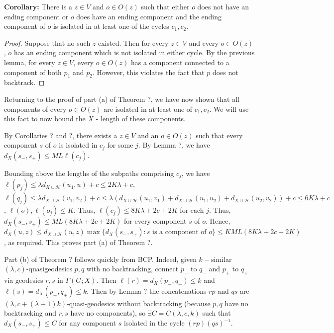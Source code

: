 \documentclass[12pt]{article}
\newcommand{\vs}{\vskip10pt}
\begin{document}
	\vs 
	
	\textbf{Corollary: } There is a $z \in V$ and $o \in O(z)$ such that either $o$ does not have an ending component or $o$ does have an ending component and the ending component of $o$ is isolated in at least one of the cycles $c_1,c_2$.
	
	\begin{proof}
		
		Suppose that no such $z$ existed. Then for every $z \in V$ and every $o \in O(z)$, $o$ has an ending component which is not isolated in either cycle. By the previous lemma, for every $z \in V$, every $o \in O(z)$ has a component connected to a component of both $p_1$ and $p_2$. However, this violates the fact that $p$ does not backtrack. 
		
	\end{proof}

	Returning to the proof of part (a) of Theorem ?, we have now shown that all components of every $o \in O(z)$ are isolated in at least one of $c_1, c_2$. We will use this fact to now bound the $X$ - length of these components. 
	
	\vs 
	
	By Corollaries ? and ?, there exists a $z \in V$ and an $o \in O(z)$ such that every component $s$ of $o$ is isolated in $c_j$ for some $j$. By Lemma ?, we have $d_X(s_-, s_+) \leq ML \ell(c_j)$. 
	
	\vs 
	
	Bounding above the lengths of the subpaths comprising $c_j$, we have $\ell(p_j) \leq \lambda d_{X \cup \mathcal{H}}(u_1, u) + c \leq 2K\lambda + c$, $\ell(q_j) \leq \lambda d_{X \cup \mathcal{H}}(v_1, v_2) + c \leq \lambda (d_{X \cup \mathcal{H}}(u_1, v_1) + d_{X \cup \mathcal{H}}(u_1, u_2) + d_{X \cup \mathcal{H}}(u_2, v_2)) + c \leq 6 K \lambda + c$, $\ell(o), \ell(o_j) \leq K$. Thus, $\ell(c_j) \leq 8K \lambda + 2c + 2K$ for each $j$.  Thus, $d_X(s_-, s_+) \leq ML(8K \lambda + 2c + 2K)$ for every component $s$ of $o$. Hence, $d_X(u,z) \leq d_{X \cup \mathcal{H}}(u,z) \max \{d_X(s_-, s_+): s \text{ is a component of } o\}\leq K ML(8K \lambda + 2c + 2K)$, as required. This proves part (a) of Theorem ?. 
	
	\vs
	
	Part (b) of Theorem ? follows quickly from BCP. Indeed, given $k-$similar $(\lambda, c)$-quasigeodesics $p,q$ with no backtracking, connect $p_-$ to $q_-$ and $p_+$ to $q_+$ via geodesics $r,s$ in $\Gamma(G;X)$. Then $\ell(r) = d_X(p_-, q_-) \leq k$ and $\ell(s) = d_X(p_+, q_+) \leq k$. Then by Lemma ? the concatenations $rp$ and $qs$ are $(\lambda, c + (\lambda + 1)k)$-quasi-geodesics without backtracking (because $p,q$ have no backtracking and $r,s$ have no components), so $\exists C = C(\lambda, c, k)$ such that $d_X(s_-, s_+) \leq C$ for any component $s$ isolated in the cycle $(rp)(qs)^{-1}$. 
	
\end{document}
